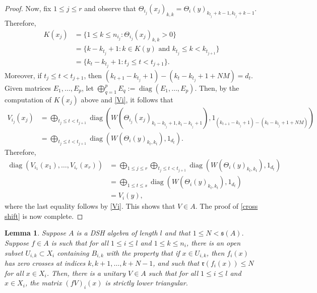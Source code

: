 \documentclass[12pt]{amsart}
\numberwithin{equation}{section}
\newtheorem{lemma}[theorem]{Lemma}
\theoremstyle{definition}
\theoremstyle{remark}
\newcommand{\diag}{\operatorname{diag}}
\begin{document}
\begin{proof}
	Now, fix $1\leq j\leq r$ and observe that $\Theta_{i_{j}}(x_{j})_{k,k}=\Theta_{i}(y)_{k_{t_{j}}+k-1, k_{t_{j}}+k-1}$. Therefore, 
	$$
	\begin{aligned}
	K(x_{j})&=\{1\leq k\leq n_{i_{j}}:\Theta_{i_{j}}(x_{j})_{k,k}>0\}\\
	&=\{k-k_{t_{j}}+1:k\in K(y)\text{ and }k_{t_{j}}\leq k<k_{t_{j+1}}\}\\
	&=\{k_{t}-k_{t_{j}}+1:t_{j}\leq t<t_{j+1}\}.
	\end{aligned}
	$$
	Moreover, if $t_{j}\leq t<t_{j+1}$, then $(k_{t+1}-k_{t_{j}}+1)-(k_{t}-k_{t_{j}}+1+NM)=d_{t}$. Given matrices $E_{1},\ldots,E_{p}$, let $\bigoplus_{q=1}^{p}E_{q}:=\diag(E_{1},\ldots,E_{p})$. Then, by the computation of $K(x_{j})$ above and \autoref{Vi}, it follows that
	$$
	\begin{aligned}
	V_{i_{j}}(x_{j})
	&=\bigoplus_{t_{j}\leq t<t_{j+1}}\diag\left(W(\Theta_{i_{j}}(x_{j})_{k_{t}-k_{t_{j}}+1,k_{t}-k_{t_{j}}+1}),1_{(k_{t+1}-k_{t_{j}}+1)-(k_{t}-k_{t_{j}}+1+NM)}\right)\\
	&=\bigoplus_{t_{j}\leq t<t_{j+1}}\diag\left(W(\Theta_{i}(y)_{k_{t},k_{t}}),1_{d_{t}}\right).
	\end{aligned}
	$$
	Therefore, 
	$$
	\begin{aligned}
	\diag(V_{i_{1}}(x_{1}),\ldots,V_{i_{r}}(x_{r}))&=\bigoplus_{1\leq j\leq r}\bigoplus_{t_{j}\leq t<t_{j+1}}\diag\left(W(\Theta_{i}(y)_{k_{t},k_{t}}),1_{d_{t}}\right)\\
	&=\bigoplus_{1\leq t\leq s}\diag\left(W(\Theta_{i}(y)_{k_{t},k_{t}}),1_{d_{t}}\right)\\
	&=V_{i}(y),
	\end{aligned}
	$$
	where the last equality follows by \autoref{Vi}. This shows that $V\in A$. The proof of \autoref{cross shift} is now complete.
\end{proof}


\begin{lemma}
	\label{lower triangular}
	Suppose $A$ is a DSH algebra of length $ l $ and that $1\leq N<\mathfrak{s}(A)$. Suppose $f\in A$ is such that for all $1\leq i\leq l $ and $1\leq k\leq n_{i}$, there is an open subset $U_{i,k}\subset X_{i}$ containing $B_{i,k}$ with the property that if $x\in U_{i,k}$, then $f_{i}(x)$ has zero crosses at indices $k,k+1,\ldots,k+N-1$, and such that $\mathfrak{r}(f_{i}(x))\leq N$ for all $x\in X_{i}$. Then, there is a unitary $V\in A$ such that for all $1\leq i\leq  l $ and $x\in X_{i}$, the matrix $(fV)_{i}(x)$ is strictly lower triangular.
\end{lemma}
\end{document}
